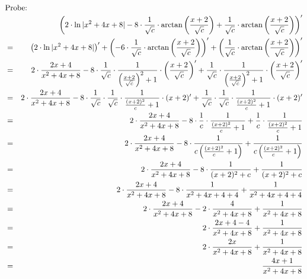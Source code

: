 \documentclass[10pt,a4paper,oneside,ngerman,numbers=noenddot]{scrartcl}
\begin{document}
\begin{alignat*}{2}
\intertext{Probe:}
&& \left(2 \cdot \ln |x^{2} + 4x + 8| -8 \cdot \frac{1}{\sqrt{c}} \cdot \arctan \left(\frac{x+2}{\sqrt{c}} \right) + \frac{1}{\sqrt{c}} \cdot \arctan \left(\frac{x+2}{\sqrt{c}} \right)\right)' \\
&=& \left(2 \cdot \ln |x^{2} + 4x + 8|\right)' + \left(-6 \cdot \frac{1}{\sqrt{c}} \cdot \arctan \left(\frac{x+2}{\sqrt{c}} \right)\right)' + \left(\frac{1}{\sqrt{c}} \cdot \arctan \left(\frac{x+2}{\sqrt{c}} \right)\right)' \\
&=& 2 \cdot \frac{2x + 4}{x^{2} + 4x + 8} - 8 \cdot \frac{1}{\sqrt{c}} \cdot \frac{1}{\left(\frac{x + 2}{\sqrt{c}} \right)^{2} + 1} \cdot \left(\frac{x + 2}{\sqrt{c}} \right)' + \frac{1}{\sqrt{c}} \cdot \frac{1}{\left(\frac{x + 2}{\sqrt{c}} \right)^{2} + 1} \cdot \left(\frac{x + 2}{\sqrt{c}} \right)' \\
&=& 2 \cdot \frac{2x + 4}{x^{2} + 4x + 8} - 8 \cdot \frac{1}{\sqrt{c}} \cdot \frac{1}{\sqrt{c}} \cdot \frac{1}{\frac{(x + 2)^{2}}{c} + 1} \cdot (x + 2)' + \frac{1}{\sqrt{c}} \cdot \frac{1}{\sqrt{c}} \cdot \frac{1}{\frac{(x + 2)^{2}}{c} + 1} \cdot (x + 2)' \\
&=& 2 \cdot \frac{2x + 4}{x^{2} + 4x + 8} - 8 \cdot \frac{1}{c} \cdot \frac{1}{\frac{(x + 2)^{2}}{c} + 1} + \frac{1}{c} \cdot \frac{1}{\frac{(x + 2)^{2}}{c} + 1} \\
&=& 2 \cdot \frac{2x + 4}{x^{2} + 4x + 8} - 8 \cdot \frac{1}{c\left(\frac{(x + 2)^{2}}{c} + 1\right)} + \frac{1}{c\left(\frac{(x + 2)^{2}}{c} + 1\right)} \\
&=& 2 \cdot \frac{2x + 4}{x^{2} + 4x + 8} - 8 \cdot \frac{1}{(x + 2)^{2} + c} + \frac{1}{(x + 2)^{2} + c} \\
&=& 2 \cdot \frac{2x + 4}{x^{2} + 4x + 8} - 8 \cdot \frac{1}{x^{2} + 4x + 4 + 4} + \frac{1}{x^{2} + 4x + 4 + 4} \\
&=& 2 \cdot \frac{2x + 4}{x^{2} + 4x + 8} - 2\cdot \frac{4}{x^{2} + 4x + 8} + \frac{1}{x^{2} + 4x + 8} \\
&=& 2 \cdot \frac{2x + 4 - 4}{x^{2} + 4x + 8} + \frac{1}{x^{2} + 4x + 8} \\
&=& 2 \cdot \frac{2x}{x^{2} + 4x + 8} + \frac{1}{x^{2} + 4x + 8} \\
&=& \frac{4x + 1}{x^{2} + 4x + 8}
\end{alignat*}
\section{} %
\end{document}
